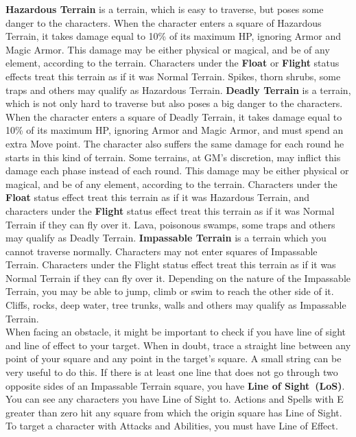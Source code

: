 \textbf{Hazardous Terrain} is a terrain, which is easy to traverse, but poses some danger to the characters. 
When the character enters a square of Hazardous Terrain, it takes damage equal to 10\% of its maximum HP, ignoring Armor and Magic Armor. 
This damage may be either physical or magical, and be of any element, according to the terrain. 
Characters under the \textbf{Float} or \textbf{Flight} status effects treat this terrain as if it was Normal Terrain. Spikes, thorn shrubs, some traps and others may qualify as Hazardous Terrain. \ofrow
\textbf{Deadly Terrain} is a terrain, which is not only hard to traverse but also poses a big danger to the characters. 
When the character enters a square of Deadly Terrain, it takes damage equal to 10\% of its maximum HP, ignoring Armor and Magic Armor, and must spend an extra Move point. 
The character also suffers the same damage for each round he starts in this kind of terrain. Some terrains, at GM’s discretion, may inflict this damage each phase instead of each round. 
This damage may be either physical or magical, and be of any element, according to the terrain. Characters under the \textbf{Float} status effect treat this terrain as if it was Hazardous Terrain, and characters under the \textbf{Flight} status effect treat this terrain as if it was Normal Terrain if they can fly over it. 
Lava, poisonous swamps, some traps and others may qualify as Deadly Terrain. \ofrow
\textbf{Impassable Terrain} is a terrain which you cannot traverse normally.
Characters may not enter squares of Impassable Terrain. 
Characters under the Flight status effect treat this terrain as if it was Normal Terrain if they can fly over it. 
Depending on the nature of the Impassable Terrain, you may be able to jump, climb or swim to reach the other side of it. 
Cliffs, rocks, deep water, tree trunks, walls and others may qualify as Impassable Terrain. 
%
\pagebreak\\
%
 When facing an obstacle, it might be important to check if you have line of sight and line of effect to your target. 
When in doubt, trace a straight line between any point of your square and any point in the target’s square. 
A small string can be very useful to do this. 
If there is at least one line that does not go through two opposite sides of an Impassable Terrain square, you have \textbf{Line of Sight~(LoS)}. 
You can see any characters you have Line of Sight to.
Actions and Spells with E greater than zero hit any square from which the origin square has Line of Sight. \ofrow
To target a character with Attacks and Abilities, you must have Line of Effect.
